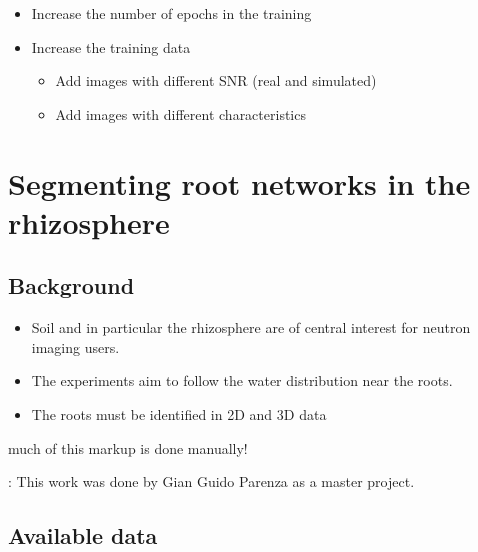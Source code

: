 \documentclass[letterpaper,10pt,english]{sphinxmanual}
\begin{document}
\begin{itemize}
\item {} 
Increase the number of epochs in the training

\item {} 
Increase the training data
\begin{itemize}
\item {} 
Add images with different SNR (real and simulated)

\item {} 
Add images with different characteristics

\end{itemize}

\end{itemize}


\chapter{Segmenting root networks in the rhizosphere}
\label{\detokenize{ML4NeutronImageSegmentation:segmenting-root-networks-in-the-rhizosphere}}

\section{Background}
\label{\detokenize{ML4NeutronImageSegmentation:background}}\begin{itemize}
\item {} 
Soil and in particular the rhizosphere are of central interest for neutron imaging users.

\item {} 
The experiments aim to follow the water distribution near the roots.

\item {} 
The roots must be identified in 2D and 3D data

\end{itemize}

 much of this mark\sphinxhyphen{}up is done manually!

: This work was done by Gian Guido Parenza as a master project.


\section{Available data}
\label{\detokenize{ML4NeutronImageSegmentation:available-data}}
\end{document}
